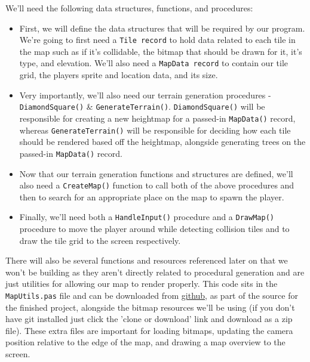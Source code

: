 \documentclass{article}
\begin{document}
We'll need the following data structures, functions, and procedures:
\begin{itemize}

\item
	First, we will define the data structures that will be required by our program. We're going to first need a \texttt{Tile record} to hold data related to each tile in the map such as if it's collidable, the bitmap that should be drawn for it, it's type, and elevation. We'll also need a \texttt{MapData record} to contain our tile grid, the players sprite and location data, and its size.
\item
	Very importantly, we'll also need our terrain generation procedures - \texttt{DiamondSquare()} \& \texttt{GenerateTerrain()}. \texttt{DiamondSquare()} will be responsible for creating a new heightmap for a passed-in \texttt{MapData()} record, whereas \texttt{GenerateTerrain()} will be responsible for deciding how each tile should be rendered based off the heightmap, alongside generating trees on the passed-in \texttt{MapData()} record.
\item
	Now that our terrain generation functions and structures are defined, we'll also need a \texttt{CreateMap()} function to call both of the above procedures and then to search for an appropriate place on the map to spawn the player.
\item
	Finally, we'll need both a \texttt{HandleInput()} procedure and a \texttt{DrawMap()} procedure to move the player around while detecting collision tiles and to draw the tile grid to the screen respectively.
	
\end{itemize}

There will also be several functions and resources referenced later on that we won't be building as they aren't directly related to procedural generation and are just utilities for allowing our map to render properly. This code sits in the \texttt{MapUtils.pas} file and can be downloaded from \href{https://github.com/jacobmilligan/intro_hd_report}{github}, as part of the source for the finished project, alongside the bitmap resources we'll be using (if you don't have git installed just click the 'clone or download' link and download as a zip file). These extra files are important for loading bitmaps, updating the camera position relative to the edge of the map, and drawing a map overview to the screen.
\end{document}
